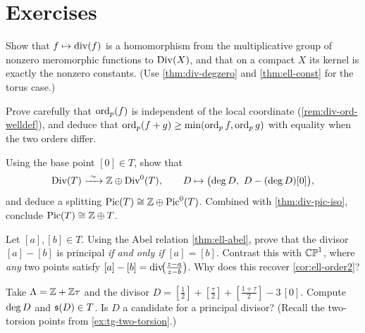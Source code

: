 \section*{Exercises}

\begin{exercise}
\label{ex:div-hom}
Show that \(f \mapsto \operatorname{div}(f)\) is a homomorphism from the multiplicative
group of nonzero meromorphic functions to \(\operatorname{Div}(X)\), and that on a compact
\(X\) its kernel is exactly the nonzero constants. (Use
\cref{thm:div-degzero} and \cref{thm:ell-const} for the torus case.)
\end{exercise}

\begin{exercise}
\label{ex:div-ord-welldef}
Prove carefully that \(\operatorname{ord}_p(f)\) is independent of the local coordinate
(\cref{rem:div-ord-welldef}), and deduce that \(\operatorname{ord}_p(f+g) \ge
\min(\operatorname{ord}_p f, \operatorname{ord}_p g)\) with equality when the two orders differ.
\end{exercise}

\begin{exercise}
\label{ex:div-pic-split}
Using the base point \([0] \in T\), show that
\[
  \operatorname{Div}(T) \xrightarrow{\ \sim\ } \mathbb{Z} \oplus \operatorname{Div}^0(T),
  \qquad D \mapsto \bigl( \operatorname{deg} D,\ D - (\operatorname{deg} D)[0] \bigr),
\]
and deduce a splitting \(\operatorname{Pic}(T) \cong \mathbb{Z} \oplus \operatorname{Pic}^0(T)\). Combined with
\cref{thm:div-pic-iso}, conclude \(\operatorname{Pic}(T) \cong \mathbb{Z} \oplus T\).
\end{exercise}

\begin{exercise}
\label{ex:div-distinct-points}
Let \([a], [b] \in T\). Using the Abel relation \cref{thm:ell-abel}, prove that
the divisor \([a] - [b]\) is principal \emph{if and only if} \([a] = [b]\).
Contrast this with \(\mathbb{CP}^1\), where \emph{any} two points satisfy
\([a] - [b] = \operatorname{div}\!\bigl(\tfrac{z-a}{z-b}\bigr)\). Why does this recover
\cref{cor:ell-order2}?
\end{exercise}

\begin{exercise}
\label{ex:div-sigma-compute}
Take \(\Lambda = \mathbb{Z} + \mathbb{Z}\tau\) and the divisor
\(D = [\tfrac12] + [\tfrac{\tau}{2}] + [\tfrac{1+\tau}{2}] - 3\,[0]\). Compute
\(\operatorname{deg} D\) and \(\mathfrak{s}(D) \in T\). Is \(D\) a candidate for a principal
divisor? (Recall the two-torsion points from \cref{ex:tg-two-torsion}.)
\end{exercise}
